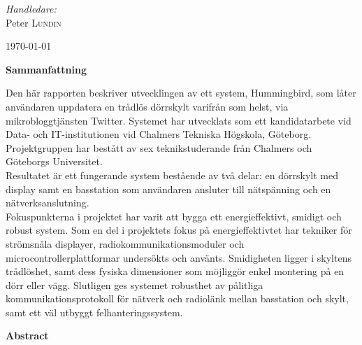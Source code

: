 \documentclass[a4paper,11pt]{article}
\begin{document}
\begin{titlepage}
\begin{center}
\begin{minipage}{0.6\textwidth}
\begin{flushleft}
\end{flushleft}
\end{minipage}
\begin{minipage}{0.3\textwidth}
\begin{flushright} \large
\emph{Handledare:} \\
Peter \textsc{Lundin}
\end{flushright}
\end{minipage}

\vfill

{\large \today}

\end{center}

\end{titlepage}
\thispagestyle{empty}
\pagebreak

\thispagestyle{empty}
\begin{center}
{\noindent \bf Sammanfattning}\\
\end{center}

Den här rapporten beskriver utvecklingen av ett system, Hummingbird, som låter användaren uppdatera en trådlös dörrskylt varifrån som helst, via mikrobloggtjänsten Twitter. Systemet har utvecklats som ett kandidatarbete vid Data- och IT-institutionen vid Chalmers Tekniska Högskola, Göteborg. Projektgruppen har bestått av sex teknikstuderande från Chalmers och Göteborgs Universitet. \\

Resultatet är ett fungerande system bestående av två delar: en dörrskylt med display samt en basstation som användaren ansluter till nätspänning och en nätverksanslutning. \\

Fokuspunkterna i projektet har varit att bygga ett energieffektivt, smidigt och robust system. Som en del i projektets fokus på energieffektivtet har tekniker för strömsnåla displayer, radiokommunikationsmoduler och microcontrollerplattformar undersökts och använts. Smidigheten ligger i skyltens trådlöshet, samt dess fysiska dimensioner som möjliggör enkel montering på en dörr eller vägg. Slutligen ges systemet robusthet av pålitliga kommunikationsprotokoll för nätverk och radiolänk mellan basstation och skylt, samt ett väl utbyggt felhanteringssystem.
	

\thispagestyle{empty}
\pagebreak

\thispagestyle{empty}
\begin{center}
{\noindent \bf Abstract}\\
\end{center}
\end{document}
